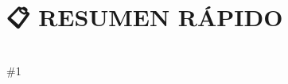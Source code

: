 \documentclass{article}
\newcommand{\resumen}[1]{
    \section*{📋 RESUMEN RÁPIDO}
    \hrulefill \\
    \#1
}
\begin{document}
\resumen{
• LIFO: Last In, First Out.
• Todas las operaciones básicas son O(1) (instantáneas).
• Usos: Historial del navegador (Undo/Redo), procesar expresiones
  matemáticas, DFS (Depth First Search).
• Muy eficiente pero limitado: solo ves el tope.
• La base de la recursión en cualquier lenguaje.
════════════════════════════════════════════════════════════════
}
\end{document}
